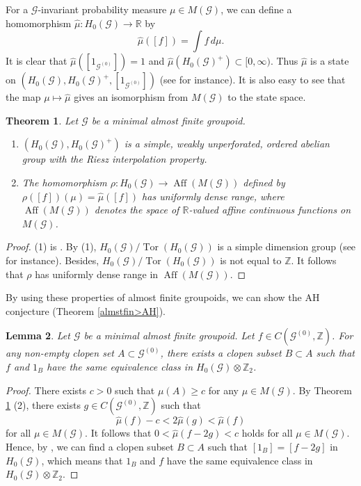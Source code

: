 \documentclass[11pt]{article}
\newtheorem{theorem}{Theorem}[section]
\newtheorem{lemma}[theorem]{Lemma}
\theoremstyle{definition}
\numberwithin{equation}{section}
\newcommand{\Aff}{\operatorname{Aff}}
\newcommand{\Tor}{\operatorname{Tor}}
\newcommand{\G}{\mathcal{G}}
\newcommand{\Z}{\mathbb{Z}}
\newcommand{\R}{\mathbb{R}}
\begin{document}
For a $\G$-invariant probability measure $\mu\in M(\G)$, 
we can define a homomorphism $\hat\mu:H_0(\G)\to\R$ by 
\[
\hat\mu([f])=\int f\,d\mu. 
\]
It is clear that 
$\hat\mu([1_{\G^{(0)}}])=1$ and $\hat\mu(H_0(\G)^+)\subset[0,\infty)$. 
Thus $\hat\mu$ is a state on $(H_0(\G),H_0(\G)^+,[1_{\G^{(0)}}])$ 
(see \cite[Definition 6.8.1]{Btext} for instance). 
It is also easy to see that the map $\mu\mapsto\hat\mu$ gives 
an isomorphism from $M(\G)$ to the state space. 

\begin{theorem}\label{almstfin2}
Let $\G$ be a minimal almost finite groupoid. 
\begin{enumerate}
\item $(H_0(\G),H_0(\G)^+)$ is a simple, weakly unperforated, 
ordered abelian group with the Riesz interpolation property. 
\item The homomorphism $\rho:H_0(\G)\to\Aff(M(\G))$ 
defined by $\rho([f])(\mu)=\hat\mu([f])$ has uniformly dense range, 
where $\Aff(M(\G))$ denotes 
the space of $\R$-valued affine continuous functions on $M(\G)$. 
\end{enumerate}
\end{theorem}
\begin{proof}
(1) is \cite[Proposition 6.10]{M12PLMS}. 
By (1), $H_0(\G)/\Tor(H_0(\G))$ is a simple dimension group 
(see \cite[Section 7.4]{Btext} for instance). 
Besides, $H_0(\G)/\Tor(H_0(\G))$ is not equal to $\Z$. 
It follows that $\rho$ has uniformly dense range in $\Aff(M(\G))$. 
\end{proof}

By using these properties of almost finite groupoids, 
we can show the AH conjecture (Theorem \ref{almstfin>AH}). 

\begin{lemma}\label{H_0mod2}
Let $\G$ be a minimal almost finite groupoid. 
Let $f\in C(\G^{(0)},\Z)$. 
For any non-empty clopen set $A\subset\G^{(0)}$, 
there exists a clopen subset $B\subset A$ 
such that $f$ and $1_B$ have the same equivalence class 
in $H_0(\G)\otimes\Z_2$. 
\end{lemma}
\begin{proof}
There exists $c>0$ such that $\mu(A)\geq c$ for any $\mu\in M(\G)$. 
By Theorem \ref{almstfin2} (2), 
there exists $g\in C(\G^{(0)},\Z)$ such that 
\[
\hat\mu(f)-c<2\hat\mu(g)<\hat\mu(f)
\]
for all $\mu\in M(\G)$. 
It follows that $0<\hat\mu(f-2g)<c$ holds for all $\mu\in M(\G)$. 
Hence, by \cite[Lemma 6.7]{M12PLMS}, 
we can find a clopen subset $B\subset A$ such that 
$[1_B]=[f-2g]$ in $H_0(\G)$, 
which means that $1_B$ and $f$ have the same equivalence class 
in $H_0(\G)\otimes\Z_2$. 
\end{proof}
\end{document}

